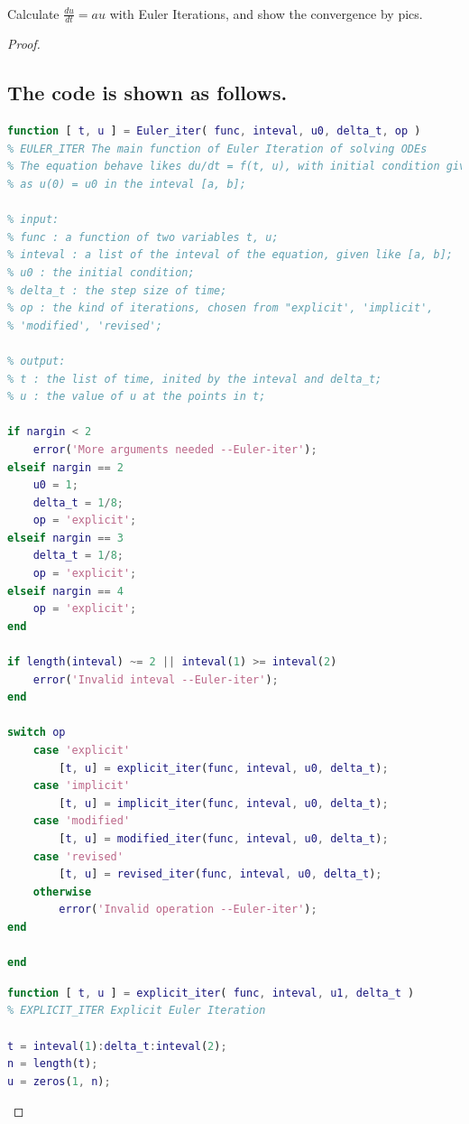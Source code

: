 \documentclass{article}
\newenvironment{problem}[2][Problem]{\begin{trivlist}
\item[\hskip \labelsep {\bfseries #1}\hskip \labelsep {\bfseries #2.}]}{\end{trivlist}}
\begin{document}
\begin{problem}{3}
\text{ } \\
Calculate $\frac{du}{dt} = au$ with Euler Iterations, and show the convergence by pics.
\end{problem}
\begin{proof}
\subsection{The code is shown as follows.}
\begin{lstlisting}[language = {MATLAB}]
function [ t, u ] = Euler_iter( func, inteval, u0, delta_t, op )
% EULER_ITER The main function of Euler Iteration of solving ODEs
% The equation behave likes du/dt = f(t, u), with initial condition given 
% as u(0) = u0 in the inteval [a, b];

% input:
% func : a function of two variables t, u;
% inteval : a list of the inteval of the equation, given like [a, b];
% u0 : the initial condition;
% delta_t : the step size of time;
% op : the kind of iterations, chosen from "explicit', 'implicit',
% 'modified', 'revised';

% output:
% t : the list of time, inited by the inteval and delta_t;
% u : the value of u at the points in t;

if nargin < 2
    error('More arguments needed --Euler-iter');
elseif nargin == 2
    u0 = 1;
    delta_t = 1/8;
    op = 'explicit';
elseif nargin == 3
    delta_t = 1/8;
    op = 'explicit';
elseif nargin == 4
    op = 'explicit';
end

if length(inteval) ~= 2 || inteval(1) >= inteval(2)
    error('Invalid inteval --Euler-iter');
end

switch op
    case 'explicit'
        [t, u] = explicit_iter(func, inteval, u0, delta_t);
    case 'implicit'
        [t, u] = implicit_iter(func, inteval, u0, delta_t);
    case 'modified'
        [t, u] = modified_iter(func, inteval, u0, delta_t);
    case 'revised'
        [t, u] = revised_iter(func, inteval, u0, delta_t);
    otherwise
        error('Invalid operation --Euler-iter');
end

end
\end{lstlisting}

\begin{lstlisting}[language = {MATLAB}]
function [ t, u ] = explicit_iter( func, inteval, u1, delta_t )
% EXPLICIT_ITER Explicit Euler Iteration

t = inteval(1):delta_t:inteval(2);
n = length(t);
u = zeros(1, n);


\end{lstlisting}
\end{proof}
\end{document}

